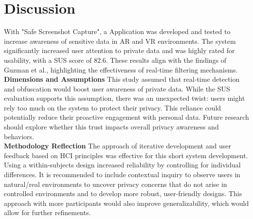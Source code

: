 \documentclass[sigconf,authordraft]{acmart}
\begin{document}
\section{Discussion}

With "Safe Screenshot Capture", a Application was developed and tested to increase awareness of sensitive data in AR and VR environments. The system significantly increased user attention to private data and was highly rated for usability, with a SUS score of 82.6. These results align with the findings of Guzman et al., highlighting the effectiveness of real-time filtering mechanisms.\\

\textbf{Dimensions and Assumptions} This study assumed that real-time detection and obfuscation would boost user awareness of private data. While the SUS evaluation supports this assumption, there was an unexpected twist: users might rely too much on the system to protect their privacy. This reliance could potentially reduce their proactive engagement with personal data. Future research should explore whether this trust impacts overall privacy awareness and behaviors.\\

\textbf{Methodology Reflection} The approach of iterative development and user feedback based on HCI principles was effective for this short system development. Using a within-subjects design increased reliability by controlling for individual differences. It is recommended to include contextual inquiry to observe users in natural/real environments to uncover privacy concerns that do not arise in controlled environments and to develop more robust, user-friendly designs. This approach with more participants would also improve generalizability, which would allow for further refinements.



\end{document}
